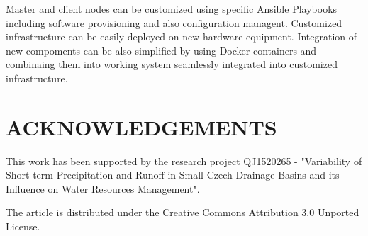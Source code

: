 \documentclass{isprs}
\begin{document}
Master and client nodes can be customized using specific Ansible
Playbooks including software provisioning and also configuration
managent. Customized infrastructure can be easily deployed on new
hardware equipment. Integration of new compoments can be also
simplified by using Docker containers and combinaing them into working
system seamlessly integrated into customized infrastructure. 

{%
  \begin{spacing}{0.9}%
     
  \end{spacing}
}

\section*{ACKNOWLEDGEMENTS}\label{ACKNOWLEDGEMENTS}

This work has been supported by the research project QJ1520265 -
"Variability of Short-term Precipitation and Runoff in Small Czech
Drainage Basins and its Influence on Water Resources Management".

The article is distributed under the Creative Commons Attribution 3.0
Unported License.
\end{document}
